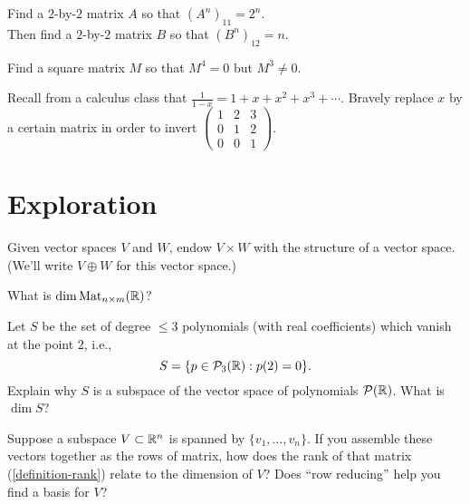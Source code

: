 \documentclass{homework}
\begin{document}
\begin{problem}
  Find a $2$-by-$2$ matrix $A$ so that $(A^n)_{11} = 2^n$.  \\
  Then find a $2$-by-$2$ matrix $B$ so that $(B^n)_{12} = n$.
\end{problem}

\begin{problem}
  Find a square matrix $M$ so that $M^4 = 0$ but $M^3 \neq 0$.
\end{problem}

\begin{problem}
  Recall from a calculus class that
  $\frac{1}{1-x} = 1 + x + x^2 + x^3 + \cdots$.  Bravely replace $x$
  by a certain matrix in order to invert
  $\begin{pmatrix} 1 & 2 & 3 \\ 0 & 1 & 2 \\ 0 & 0 & 1 \end{pmatrix}$.
\end{problem}

\section{Exploration}

\begin{problem}
  Given vector spaces $V$ and $W$, endow $V \times W$ with the
  structure of a vector space.  (We'll write $V \oplus W$ for this
  vector space.)
\end{problem}

\begin{problem}
  What is $\dim \operatorname{Mat}_{n \times m}(\mathbb{R})$?
\end{problem}

\begin{problem}
  Let $S$ be the set of degree $\leq 3$ polynomials (with real
  coefficients) which vanish at the point $2$, i.e.,
  \[ S = \{ p \in \mathcal{P}_{3}(\mathbb{R}) : p(2) = 0 \}. \] Explain
  why $S$ is a subspace of the vector space of polynomials
  $\mathcal{P}(\mathbb{R})$.  What is $\dim S$?
\end{problem}

\begin{problem}
  Suppose a subspace $V \subset \mathbb{R}^n$ is spanned by
  $\{v_1,\ldots,v_n\}$.  If you assemble these vectors together as the
  rows of matrix, how does the rank of that matrix
  (\ref{definition-rank}) relate to the dimension of $V$?  Does ``row
  reducing'' help you find a basis for $V$?
\end{problem}
\end{document}
